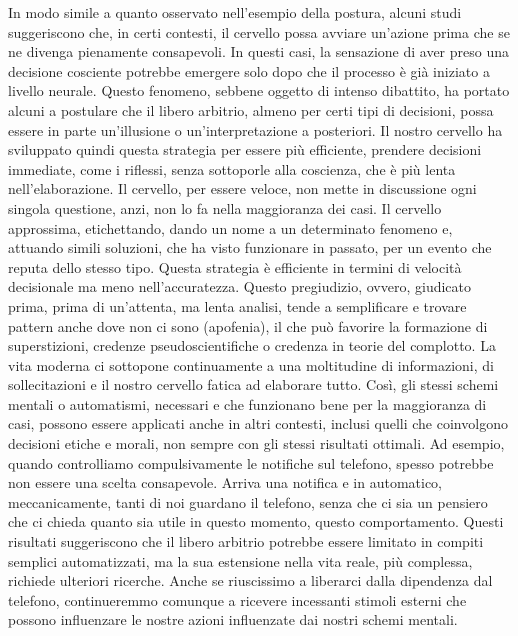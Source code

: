 \documentclass[12pt]{book} %
\begin{document}
In modo simile a quanto osservato nell'esempio della postura, alcuni studi suggeriscono che, in certi contesti, il cervello possa avviare un'azione prima che se ne divenga pienamente consapevoli. In questi casi, la sensazione di aver preso una decisione cosciente potrebbe emergere solo dopo che il processo è già iniziato a livello neurale. Questo fenomeno, sebbene oggetto di intenso dibattito, ha portato alcuni a postulare che il libero arbitrio, almeno per certi tipi di decisioni, possa essere in parte un'illusione o un'interpretazione a posteriori. Il nostro cervello ha sviluppato quindi questa strategia per
essere più efficiente, prendere decisioni immediate, come i riflessi, senza sottoporle alla coscienza, che è più lenta
nell'elaborazione. Il cervello, per essere veloce, non mette in discussione ogni singola
questione, anzi, non lo fa nella maggioranza dei casi. Il cervello approssima, etichettando, dando un nome a un determinato fenomeno e,
attuando simili soluzioni, che ha visto funzionare in passato, per un evento che reputa dello stesso tipo.
Questa strategia è efficiente in termini di velocità decisionale ma meno nell'accuratezza. Questo pregiudizio, ovvero, giudicato prima, prima di un'attenta, ma lenta analisi, tende a semplificare e trovare pattern anche dove non ci sono (apofenia), il che può favorire la formazione di superstizioni, credenze pseudoscientifiche o credenza in teorie del complotto. La vita
moderna ci sottopone continuamente a una moltitudine di informazioni, di sollecitazioni e il nostro cervello fatica ad elaborare tutto. Così, gli stessi schemi mentali o automatismi, necessari e che funzionano bene per la maggioranza di casi, possono essere applicati anche in altri contesti, inclusi quelli che coinvolgono decisioni etiche e morali, non sempre con gli stessi risultati ottimali. 
Ad esempio, quando controlliamo compulsivamente le notifiche sul telefono, spesso potrebbe non essere una scelta consapevole. Arriva una notifica e in automatico, meccanicamente, tanti di noi guardano il telefono, senza che ci sia un pensiero che ci chieda quanto sia utile in questo momento, questo comportamento. Questi risultati suggeriscono che il libero arbitrio potrebbe essere limitato in compiti semplici automatizzati, ma la sua estensione nella vita reale, più complessa, richiede ulteriori ricerche. Anche se riuscissimo a liberarci dalla dipendenza dal telefono, continueremmo comunque a ricevere incessanti stimoli esterni che possono influenzare le nostre azioni influenzate dai nostri schemi mentali.
\end{document}
